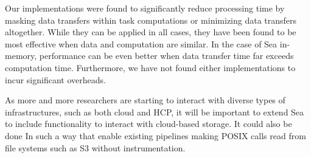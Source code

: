 Our implementations were found to significantly reduce processing time by masking data
transfers within task computations or minimizing data transfers altogether.
While they can be applied in all cases, they
have been found to be most effective when data and computation are similar. In the case of Sea in-memory,
performance can be even better when data transfer time far exceeds computation time.
Furthermore, we have not found either implementations to incur significant
overheads.

As more and more researchers are starting to interact with diverse types of
infrastructures, such as both cloud and HCP, it will be important to extend Sea
to include functionality to interact with cloud-based storage. It could also be
done In such a way that enable existing pipelines making POSIX calls read from
file systems such as S3 without instrumentation.



